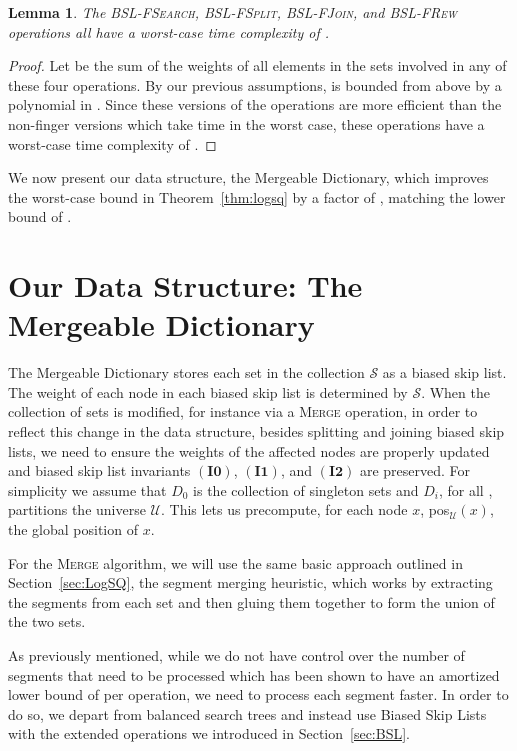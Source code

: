 \documentclass[11pt]{article}
\newcommand{\Ds}{Mergeable Dictionary}
\newcommand{\kwUnion}{Merge}
\newcommand{\Union}{\mbox{\textsc{\kwUnion{}}}}
\newcommand{\Bslfsrc}{\mbox{\textsc{BSL-FSearch}}}
\newcommand{\Bslfspl}{\mbox{\textsc{BSL-FSplit}}}
\newcommand{\Bslfjoin}{\mbox{\textsc{BSL-FJoin}}}
\newcommand{\Bslfrew}{\mbox{\textsc{BSL-FRew}}}
\newcommand{\segments}{{\segment}s}
\newcommand{\segment}{segment}
\newcommand{\invzero}{\ensuremath{\mathbf{(I0)}}}
\newcommand{\invone}{\ensuremath{\mathbf{(I1)}}}
\newcommand{\invtwo}{\ensuremath{\mathbf{(I2)}}}
\newcommand{\universe}{\ensuremath{\mathcal U}}
\newcommand{\node}[1]{\ensuremath{#1}}
\newcommand{\nodeposition}[2]{pos\ensuremath{_{\set #1}(\node #2)}}
\newcommand{\set}[1]{\ensuremath{#1}}
\newcommand{\collection}[1]{\ensuremath{\mathcal #1}}
\newcommand{\datast}[1]{\ensuremath{D_{#1}}}
\newcounter{count}
\newtheorem{lemma}[count]{Lemma}
\begin{document}
\begin{lemma} 
\label{lem:logncostofextended} 
The \Bslfsrc{}, \Bslfspl{}, \Bslfjoin{}, and \Bslfrew{} operations all have a worst-case time complexity of . 
\end{lemma} 


\begin{proof} 
Let  be the sum of the weights of all elements in the sets involved in any of these four operations. By our previous assumptions,  is bounded from above by a polynomial in . Since these versions of the operations are more efficient than the non-finger versions which take  time in the worst case, these operations have a worst-case time complexity of  . 
\end{proof} 





We now present our data structure, the \Ds{}, which improves the worst-case bound in Theorem~\ref{thm:logsq} by a factor of , matching the lower bound of \cite{conf/stoc/PatrascuD04}. 




\section{Our Data Structure: The Mergeable Dictionary} 
\label{sec:DS} 


The \Ds{} stores each set in the collection \collection S as a biased skip list.  The weight of each node in each biased skip list is determined by \collection S. When the collection of sets is modified, for instance via a \Union{} operation, in order to reflect this change in the data structure, besides splitting and joining biased skip lists, we need to ensure the weights of the affected nodes are properly updated and biased skip list invariants \invzero{}, \invone{}, and \invtwo{} are preserved. For simplicity we assume that \datast 0 is the collection of singleton sets and \datast i, for all , partitions the universe \universe. This lets us precompute, for each node \node x, \nodeposition{\universe}{x}, the global position of \node x. 
  
For the \Union{} algorithm, we will use the same basic approach outlined in Section~\ref{sec:LogSQ}, the \segment{} merging heuristic, which works by extracting the \segments{} from each set and then gluing them together to form the union of the two sets. 

As previously mentioned, while we do not have control over the number of \segments{} that need to be processed which has been shown to have an amortized lower bound of  per operation, we need to process each \segment{} faster. In order to do so, we depart from balanced search trees and instead use Biased Skip Lists \cite{journals/algorithmica/BagchiBG05} with the extended operations we introduced in Section~\ref{sec:BSL}. 
\end{document}
